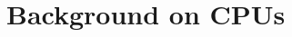 \documentclass[english,letter paper,12pt,leqno]{article}
\theoremstyle{example}
\newtheorem{example}[theorem]{Example}
\numberwithin{equation}{section}
\def\Hom{\operatorname{Hom}}
\DeclareMathOperator{\End}{End}
\begin{document}






\section{Background on CPUs}\label{section:appendix_cpu}
\end{document}
